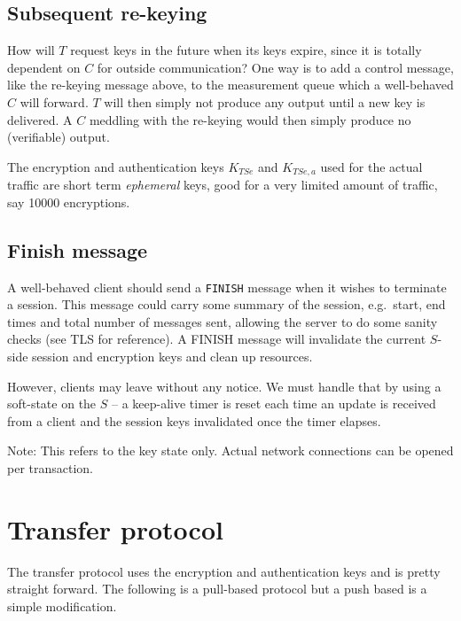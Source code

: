 \documentclass[10pt,a4paper]{article}
\begin{document}

\subsection{Subsequent re-keying}

How will $T$ request keys in the future when its keys expire, since it is totally dependent on $C$ for outside communication? One way is to add a control message, like the re-keying message above, to the measurement queue which a well-behaved $C$ will forward. $T$ will then simply not produce any output until a new key is delivered. A $C$ meddling with the re-keying would then simply produce no (verifiable) output.

The encryption and authentication keys $K_{TSe}$ and $K_{TSe,a}$ used for the actual traffic are short term \textit{ephemeral} keys, good for a very limited amount of traffic, say 10000 encryptions.

\subsection{Finish message}

A well-behaved client should send a \texttt{FINISH} message when it wishes to terminate a session. This message could carry some summary of the session, e.g.\ start, end times and total number of messages sent, allowing the server to do some sanity checks (see TLS for reference). A FINISH message will invalidate the current $S$-side session and encryption keys and clean up resources. 

However, clients may leave without any notice. We must handle that by using a soft-state on the $S$ -- a keep-alive timer is reset each time an update is received from a client and the session keys invalidated once the timer elapses.

Note: This refers to the key state only. Actual network connections can be opened per transaction.


\section{Transfer protocol}

The transfer protocol uses the encryption and authentication keys and is pretty straight forward. The following is a pull-based protocol but a push based is a simple modification.
\end{document}
